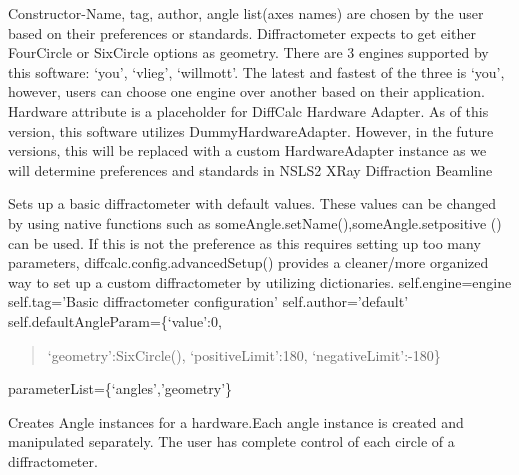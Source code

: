 \documentclass[letterpaper,10pt,english]{sphinxmanual}
\begin{document}
\begin{fulllineitems}
\label{Developer Manual:Diffractometer.Diffractometer}
Constructor-Name, tag, author, angle list(axes names) are chosen by the user based on their preferences or standards. Diffractometer expects to get either FourCircle or SixCircle options as geometry. There are 3 engines supported by this software: `you', `vlieg', `willmott'. The latest and fastest of the three is `you', however, users can choose one engine over another based on their application. Hardware attribute is a placeholder for DiffCalc Hardware Adapter. As of this version, this software utilizes DummyHardwareAdapter. However, in the future versions, this will be replaced with a custom HardwareAdapter instance as we will determine preferences and standards in NSLS2 XRay Diffraction Beamline

\begin{fulllineitems}
\label{Developer Manual:Diffractometer.Diffractometer.basicSetup}
Sets up a basic diffractometer with default values. These values can be changed by using native functions such as
someAngle.setName(),someAngle.setpositive () can be used. If this is not the preference as this requires setting up too many parameters,
diffcalc.config.advancedSetup() provides a cleaner/more organized way to set up a custom diffractometer by utilizing dictionaries.
self.engine=engine   
self.tag='Basic diffractometer configuration'
self.author='default'
self.defaultAngleParam=\{`value':0,
\begin{quote}

`geometry':SixCircle(),
`positiveLimit':180,
`negativeLimit':-180\}
\end{quote}

parameterList=\{`angles','geometry'\}

\end{fulllineitems}


\begin{fulllineitems}
\label{Developer Manual:Diffractometer.Diffractometer.createAngles}
Creates Angle instances for a hardware.Each angle instance is created and manipulated
separately. The user has complete control of each circle of a diffractometer.


\end{fulllineitems}
\end{fulllineitems}
\end{document}
